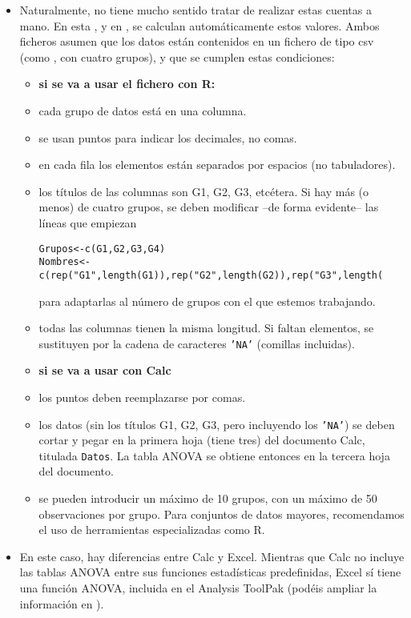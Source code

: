 \begin{itemize}
    \item Naturalmente, no tiene mucho sentido tratar de realizar estas cuentas a mano. En esta , y en
    ,
    se calculan automáticamente estos valores. Ambos ficheros asumen que los datos están contenidos en un fichero de tipo csv (como
    , con cuatro grupos), y que se cumplen estas condiciones:
        \begin{itemize}
        \item[] {\bf si se va a usar el fichero con R:}
        \item cada grupo de datos está en una columna.
        \item se usan puntos para indicar los decimales, no comas.
        \item en cada fila los elementos están separados por espacios (no tabuladores).
        \item los títulos de las columnas son G1, G2, G3, etcétera. Si hay más (o menos) de cuatro grupos, se deben modificar --de forma evidente-- las líneas que empiezan
        \begin{verbatim}
Grupos<-c(G1,G2,G3,G4)
Nombres<-c(rep("G1",length(G1)),rep("G2",length(G2)),rep("G3",length(
        \end{verbatim}
        para adaptarlas al número de grupos con el que estemos trabajando.
        \item todas las columnas tienen la misma longitud. Si faltan elementos, se sustituyen por la cadena de caracteres {\tt 'NA'} (comillas incluidas).
        \item[] {\bf si se va a usar con Calc}
        \item los puntos deben reemplazarse por comas.
        \item los datos (sin los títulos G1, G2, G3, pero incluyendo los {\tt 'NA'}) se deben cortar y pegar en la primera hoja (tiene tres) del documento Calc, titulada {\tt Datos}. La tabla ANOVA se obtiene entonces en la tercera hoja del documento.
        \item se pueden introducir un máximo de 10 grupos, con un máximo de 50 observaciones por grupo. Para conjuntos de datos mayores, recomendamos el uso de herramientas especializadas como R.
        \end{itemize}
    \item En este caso, hay diferencias entre Calc y Excel. Mientras que Calc no incluye las tablas ANOVA entre sus funciones estadísticas predefinidas, Excel sí tiene una función ANOVA, incluida en el Analysis ToolPak (podéis ampliar la información en ).


\end{itemize}
